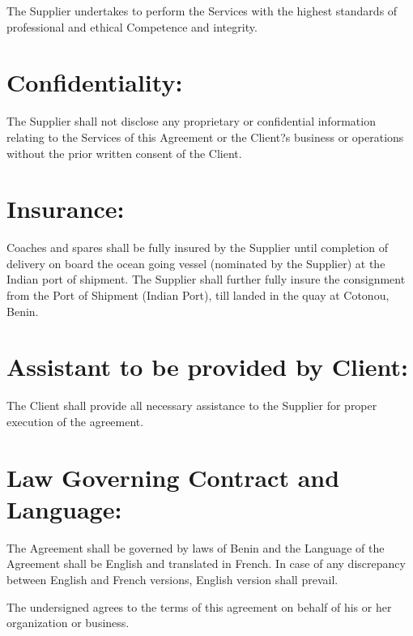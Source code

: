 \documentclass{standalone}
\begin{document}
The   Supplier   undertakes to   perform the Services with the highest standards of professional and ethical Competence and integrity. 

\section{Confidentiality:}

The Supplier shall not disclose any proprietary or confidential information relating to the Services of this Agreement or the Client?s business or operations without the prior written consent of the Client.


\section{Insurance:}

Coaches and spares shall be fully insured by the Supplier until completion of delivery on board the ocean going vessel (nominated by the Supplier) at the Indian port of shipment. The Supplier shall further fully insure the consignment from the Port of Shipment (Indian Port), till landed in the quay at Cotonou, Benin.

\section{Assistant to be provided by Client:}

The Client shall provide all necessary assistance to the Supplier for proper execution of the agreement.


\section{Law Governing Contract and Language:}

The Agreement shall be governed by laws of Benin and the Language of the Agreement shall be English and translated in French. In case of any discrepancy between English and French versions, English version shall prevail.


\vspace{1cm} 

\noindent The undersigned agrees to the terms of this agreement on behalf of his or
her organization or business.\\
\end{document}
